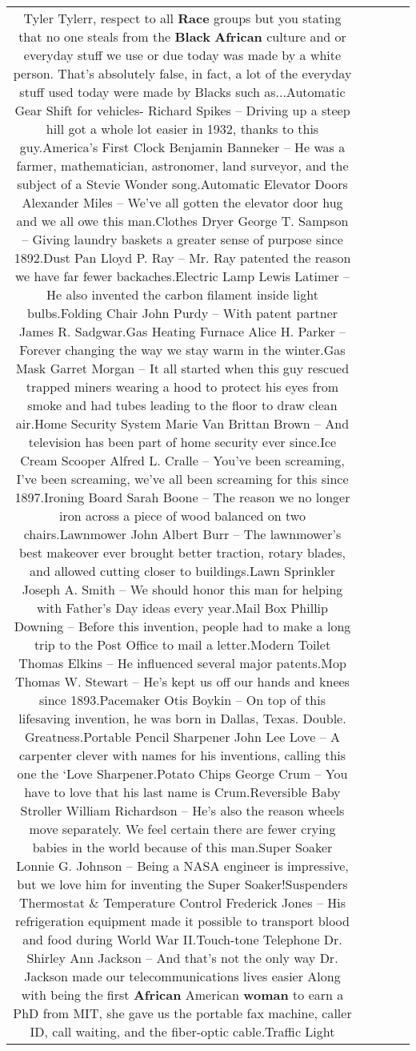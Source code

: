 \documentclass[11pt]{article}
\newlength\mylength
\begin{document}
\begin{center}
\begin{longtable}{|C{.65\mylength}|C{.30\mylength}|C{.12\mylength}|C{.12\mylength}|C{.12\mylength}|}
  \small Tyler Tylerr, respect to all \textbf{Race} groups but you stating that no one steals from the \textbf{Black} \textbf{African} culture and or everyday stuff we use or due today was made by a white person. That's absolutely false, in fact, a lot of the everyday stuff used today were made by Blacks such as...Automatic Gear Shift for vehicles- Richard Spikes – Driving up a steep hill got a whole lot easier in 1932, thanks to this guy.America's First Clock Benjamin Banneker – He was a farmer, mathematician, astronomer, land surveyor, and the subject of a Stevie Wonder song.Automatic Elevator Doors Alexander Miles – We've all gotten the elevator door hug and we all owe this man.Clothes Dryer George T. Sampson – Giving laundry baskets a greater sense of purpose since 1892.Dust Pan Lloyd P. Ray – Mr. Ray patented the reason we have far fewer backaches.Electric Lamp Lewis Latimer – He also invented the carbon filament inside light bulbs.Folding Chair John Purdy – With patent partner James R. Sadgwar.Gas Heating Furnace Alice H. Parker – Forever changing the way we stay warm in the winter.Gas Mask Garret Morgan – It all started when this guy rescued trapped miners wearing a hood to protect his eyes from smoke and had tubes leading to the floor to draw clean air.Home Security System Marie Van Brittan Brown – And television has been part of home security ever since.Ice Cream Scooper Alfred L. Cralle – You've been screaming, I've been screaming, we've all been screaming for this since 1897.Ironing Board Sarah Boone – The reason we no longer iron across a piece of wood balanced on two chairs.Lawnmower John Albert Burr – The lawnmower's best makeover ever brought better traction, rotary blades, and allowed cutting closer to buildings.Lawn Sprinkler Joseph A. Smith – We should honor this man for helping with Father's Day ideas every year.Mail Box Phillip Downing – Before this invention, people had to make a long trip to the Post Office to mail a letter.Modern Toilet Thomas Elkins – He influenced several major patents.Mop Thomas W. Stewart – He's kept us off our hands and knees since 1893.Pacemaker Otis Boykin – On top of this lifesaving invention, he was born in Dallas, Texas. Double. Greatness.Portable Pencil Sharpener John Lee Love – A carpenter clever with names for his inventions, calling this one the ‘Love Sharpener.Potato Chips George Crum – You have to love that his last name is Crum.Reversible Baby Stroller William Richardson – He's also the reason wheels move separately. We feel certain there are fewer crying babies in the world because of this man.Super Soaker Lonnie G. Johnson – Being a NASA engineer is impressive, but we love him for inventing the Super Soaker!Suspenders Thermostat \& Temperature Control Frederick Jones – His refrigeration equipment made it possible to transport blood and food during World War II.Touch-tone Telephone Dr. Shirley Ann Jackson – And that's not the only way Dr. Jackson made our telecommunications lives easier Along with being the first \textbf{African} American \textbf{woman} to earn a PhD from MIT, she gave us the portable fax machine, caller ID, call waiting, and the fiber-optic cable.Traffic Light 
\end{longtable}
\end{center}
\end{document}

